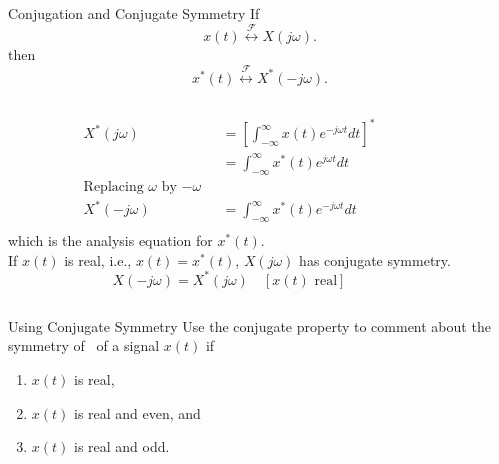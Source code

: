 \begin{frame}{Conjugation and Conjugate Symmetry}
    If
    \begin{equation*}
        x(t)  \overset{\mathcal{F}}{\longleftrightarrow}  X(j\omega).
    \end{equation*}
    then
    \begin{equation*}
        x^\ast(t)  \overset{\mathcal{F}}{\longleftrightarrow}  X^\ast(-j\omega).
    \end{equation*}
    \pause
    {
        \begin{columns}
                \begin{align*}
                    X^\ast(j\omega) &= \left[\int_{-\infty}^{\infty}x(t)e^{-j\omega t} dt \right]^\ast\\
                    &= \int_{-\infty}^{\infty}x^\ast(t)e^{j\omega t} dt\\
                    \text{Replacing $\omega$ by $-\omega$ }\\
                    X^\ast(-j\omega) &= \int_{-\infty}^{\infty}x^\ast(t)e^{-j\omega t} dt\\
                \end{align*}
                which is the analysis equation for $x^\ast(t)$.\\
                \pause
                If $x(t)$ is real, i.e., $x(t) = x^\ast(t)$, $X(j\omega)$ has conjugate symmetry.
                \begin{equation*}
                    X(-j\omega) = X^\ast(j\omega)\quad [x(t) \text{ real}]
                \end{equation*}
            
        \end{columns}



    }


\end{frame}

\begin{frame}{Using Conjugate Symmetry}
    Use the conjugate property to comment about the symmetry of \ft~of a signal $x(t)$ if
    \begin{enumerate}
        \item $x(t)$ is real,
        \item $x(t)$ is real and even, and
        \item $x(t)$ is real and odd.
    \end{enumerate}
\end{frame}

